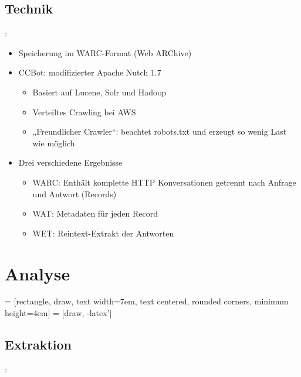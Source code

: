 \documentclass[12pt, utf8, ngerman]{beamer}
\begin{document}
\subsection{Technik}
\begin{frame}{\insertsection: \insertsubsection}
    \begin{itemize}
        \item Speicherung im WARC-Format (Web ARChive)
        \item CCBot: modifizierter Apache Nutch 1.7
            \begin{itemize}
                \item Basiert auf Lucene, Solr und Hadoop
                \item Verteiltes Crawling bei AWS
                \item „Freundlicher Crawler“: beachtet robots.txt und erzeugt so wenig Last wie möglich
            \end{itemize}
        \item Drei verschiedene Ergebnisse
            \begin{itemize}
                \item WARC: Enthält komplette HTTP Konversationen getrennt nach
                    Anfrage und Antwort (Records)
                \item WAT: Metadaten für jeden Record
                \item WET: Reintext-Extrakt der Antworten
            \end{itemize}
    \end{itemize}
\end{frame}


\section{Analyse}


 = [rectangle, draw, text width=7em, text centered, rounded corners, minimum height=4em]
 = [draw, -latex']

\subsection{Extraktion}
\begin{frame}{\insertsection: \insertsubsection}
    \centering
    \vspace{.5cm}
\end{frame}
\end{document}
